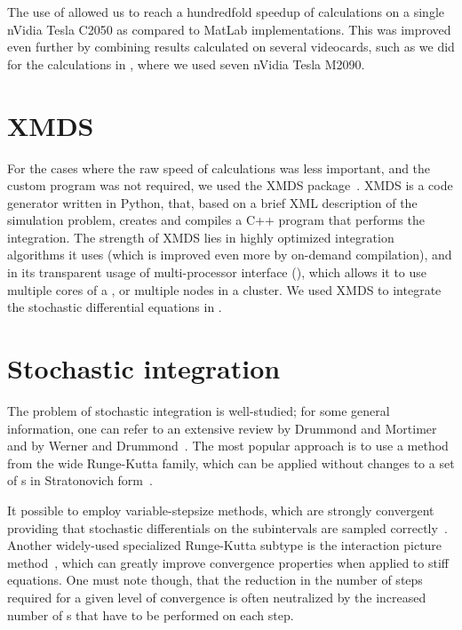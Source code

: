 The use of  allowed us to reach a hundredfold speedup of calculations on a single nVidia Tesla C2050 as compared to MatLab implementations.
This was improved even further by combining results calculated on several videocards, such as we did for the calculations in , where we used seven nVidia Tesla M2090.


\section{XMDS}

For the cases where the raw speed of calculations was less important, and the custom  program was not required, we used the XMDS package~\cite{Collecutt2001,Dennis2013}.
XMDS is a code generator written in Python, that, based on a brief XML description of the simulation problem, creates and compiles a C++ program that performs the integration.
The strength of XMDS lies in highly optimized integration algorithms it uses (which is improved even more by on-demand compilation), and in its transparent usage of multi-processor interface (), which allows it to use multiple cores of a , or multiple nodes in a cluster.
We used XMDS to integrate the stochastic differential equations in .


\section{Stochastic integration}

The problem of stochastic integration is well-studied; for some general information, one can refer to an extensive review by Drummond and Mortimer~\cite{Drummond1990} and by Werner and Drummond~\cite{Werner1997}.
The most popular approach is to use a method from the wide Runge-Kutta family, which can be applied without changes to a set of s in Stratonovich form~\cite{Wilkie2004,Wilkie2005}.

It possible to employ variable-stepsize methods, which are strongly convergent providing that stochastic differentials on the subintervals are sampled correctly~\cite{Wilkie2005}.
Another widely-used specialized Runge-Kutta subtype is the  interaction picture method~\cite{CaradocDavies2000}, which can greatly improve convergence properties when applied to stiff equations.
One must note though, that the reduction in the number of steps required for a given level of convergence is often neutralized by the increased number of s that have to be performed on each step.

